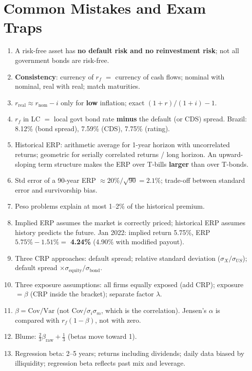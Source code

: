 \section{Common Mistakes and Exam Traps}
\begin{trapbox}
\begin{enumerate}[leftmargin=*]
  \item A risk-free asset has \textbf{no default risk and no reinvestment risk}; not all government bonds are risk-free.
  \item \textbf{Consistency}: currency of $r_f$ $=$ currency of cash flows; nominal with nominal, real with real; match maturities.
  \item $r_{\text{real}}\approx r_{\text{nom}}-i$ only for \textbf{low} inflation; exact $(1+r)/(1+i)-1$.
  \item $r_f$ in LC $=$ local govt bond rate \textbf{minus} the default (or CDS) spread. Brazil: 8.12\% (bond spread), 7.59\% (CDS), 7.75\% (rating).
  \item Historical ERP: arithmetic average for 1-year horizon with uncorrelated returns; geometric for serially correlated returns / long horizon. An upward-sloping term structure makes the ERP over T-bills \textbf{larger} than over T-bonds.
  \item Std error of a 90-year ERP $\approx20\%/\sqrt{90}=2.1\%$; trade-off between standard error and survivorship bias.
  \item Peso problems explain at most 1--2\% of the historical premium.
  \item Implied ERP assumes the market is correctly priced; historical ERP assumes history predicts the future. Jan 2022: implied return 5.75\%, ERP $5.75\%-1.51\%=$ \textbf{4.24\%} (4.90\% with modified payout).
  \item Three CRP approaches: default spread; relative standard deviation ($\sigma_X/\sigma_{US}$); default spread $\times\sigma_{\text{equity}}/\sigma_{\text{bond}}$.
  \item Three exposure assumptions: all firms equally exposed (add CRP); exposure $=\beta$ (CRP inside the bracket); separate factor $\lambda$.
  \item $\beta=\text{Cov}/\text{Var}$ (not Cov/$\sigma_i\sigma_m$, which is the correlation). Jensen's $\alpha$ is compared with $r_f(1-\beta)$, not with zero.
  \item Blume: $\frac23\beta_{\text{raw}}+\frac13$ (betas move toward 1).
  \item Regression beta: 2--5 years; returns including dividends; daily data biased by illiquidity; regression beta reflects past mix and leverage.

\end{enumerate}
\end{trapbox}
